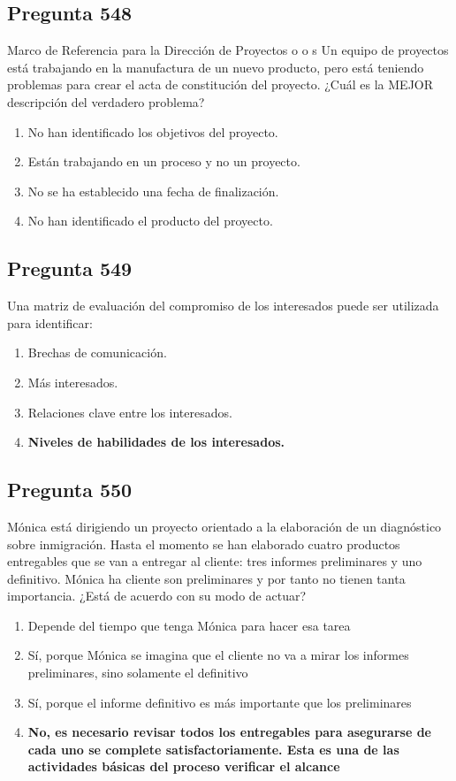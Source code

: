 \documentclass[11pt,a4paper]{article}
\begin{document}
\subsection*{Pregunta 548}
Marco de Referencia para la Dirección de Proyectos o o s Un equipo de proyectos está trabajando en la manufactura de un nuevo producto, pero está teniendo problemas para crear el acta de constitución del proyecto. ¿Cuál es la MEJOR descripción del verdadero problema?

\begin{enumerate}[label=\alph*)]
  \item No han identificado los objetivos del proyecto.
  \item Están trabajando en un proceso y no un proyecto.
  \item No se ha establecido una fecha de finalización.
  \item No han identificado el producto del proyecto.
\end{enumerate}

\subsection*{Pregunta 549}
Una matriz de evaluación del compromiso de los interesados puede ser utilizada para identificar:

\begin{enumerate}[label=\alph*)]
  \item Brechas de comunicación.
  \item Más interesados.
  \item Relaciones clave entre los interesados.
  \item \textbf{Niveles de habilidades de los interesados.}
\end{enumerate}

\subsection*{Pregunta 550}
Mónica está dirigiendo un proyecto orientado a la elaboración de un diagnóstico sobre inmigración. Hasta el momento se han elaborado cuatro productos entregables que se van a entregar al cliente: tres informes preliminares y uno definitivo. Mónica ha cliente son preliminares y por tanto no tienen tanta importancia. ¿Está de acuerdo con su modo de actuar?

\begin{enumerate}[label=\alph*)]
  \item Depende del tiempo que tenga Mónica para hacer esa tarea
  \item Sí, porque Mónica se imagina que el cliente no va a mirar los informes preliminares, sino solamente el definitivo
  \item Sí, porque el informe definitivo es más importante que los preliminares
  \item \textbf{No, es necesario revisar todos los entregables para asegurarse de cada uno se complete satisfactoriamente. Esta es una de las actividades básicas del proceso verificar el alcance}
\end{enumerate}
\end{document}

